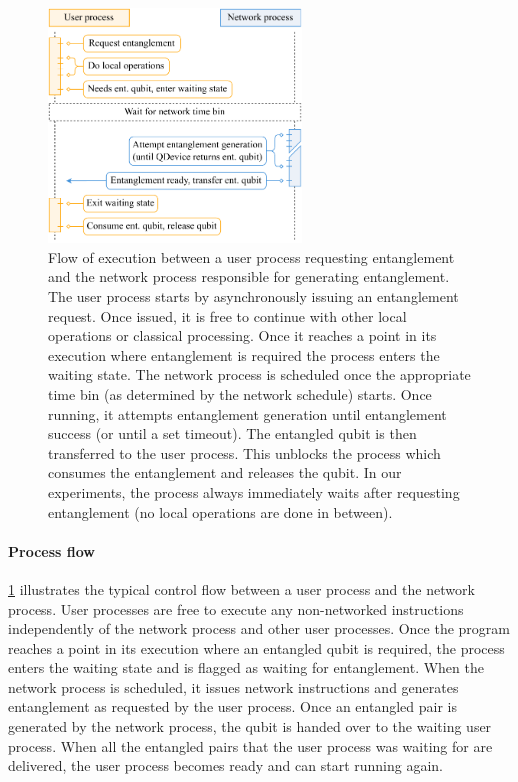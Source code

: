 \begin{figure}
\centering
\includegraphics[width=0.6\textwidth]{figures/qnodeos/supplementary/process-flow.pdf}
\caption{Flow of execution between a user process requesting entanglement and the network process responsible for generating entanglement. The user process starts by asynchronously issuing an entanglement request. Once issued, it is free to continue with other local operations or classical processing. Once it reaches a point in its execution where entanglement is required the process enters the waiting state. The network process is scheduled once the appropriate time bin (as determined by the network schedule) starts. Once running, it attempts entanglement generation until entanglement success (or until a set timeout). The entangled qubit is then transferred to the user process. This unblocks the process which consumes the entanglement and releases the qubit. In our experiments, the process always immediately waits after requesting entanglement (no local operations are done in between).}
\label{qnodeos:fig:process-flow}
\end{figure}

\paragraph{Process flow}

\cref{qnodeos:fig:process-flow} illustrates the typical control flow between a user process and the network process. User processes are free to execute any non-networked instructions independently of the network process and other user processes. Once the program reaches a point in its execution where an entangled qubit is required, the process enters the waiting state and is flagged as waiting for entanglement. When the network process is scheduled, it issues network instructions and generates entanglement as requested by the user process. Once an entangled pair is generated by the network process, the qubit is handed over to the waiting user process. When all the entangled pairs that the user process was waiting for are delivered, the user process becomes ready and can start running again.

